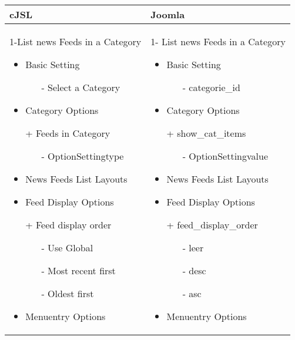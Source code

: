 \begin{minipage}{0.7\textwidth}
\begin{tabular}{|p{} | p{}|}
\hline
\textbf{cJSL} & \textbf{Joomla} \\ 
\hline
 1-List news Feeds in a Category
   \begin{itemize}
     \item Basic  Setting 
    		\begin{enumerate}
    			\item[-] Select a Category 
    		\end{enumerate}
    	\item Category Options
    	\item[+] Feeds in Category 
    		    	  \begin{enumerate}
    		    			 \item[-] OptionSettingtype
    		    	\end{enumerate}
    \item News Feeds List Layouts
    \item Feed Display Options
    \item[+] Feed display order
           	\begin{enumerate}
           		\item[-] Use Global
           		\item[-] Most recent first
           		\item[-] Oldest first
           	\end{enumerate}	
 	\item Menuentry Options
  \end{itemize}
 & 
1- List news Feeds in a Category
  \begin{itemize}
    \item Basic  Setting 
   		\begin{enumerate}
   			\item[-] categorie\_id
   		\end{enumerate}
   	\item Category Options
   	\item[+] show\_cat\_items
		\begin{enumerate}
 			 \item[-] OptionSettingvalue
	    	\end{enumerate}
   	\item News Feeds List Layouts
   	\item Feed Display Options
   	\item[+] feed\_display\_order
   	   	\begin{enumerate}
   	   		\item[-] leer
   	   		\item[-] desc
   	   		\item[-] asc
   	   	\end{enumerate}	
	\item Menuentry Options
 \end{itemize}
\\
\hline
\end{tabular}
\end{minipage}

